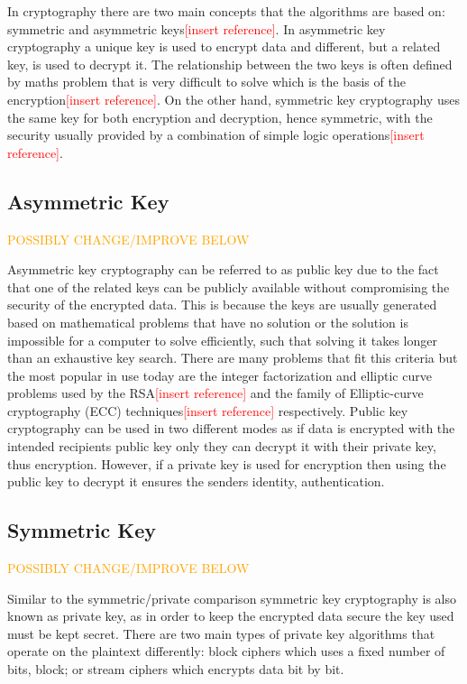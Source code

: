 \documentclass[12pt,twoside,a4paper]{report}
\begin{document}
	In cryptography there are two main concepts that the algorithms are based on: symmetric and asymmetric keys\textcolor{red}{[insert reference]}. In asymmetric key cryptography a unique key is used to encrypt data and different, but a related key, is used to decrypt it. The relationship between the two keys is often defined by maths problem that is very difficult to solve which is the basis of the encryption\textcolor{red}{[insert reference]}. On the other hand, symmetric key cryptography uses the same key for both encryption and decryption, hence symmetric, with the security usually provided by a combination of simple logic operations\textcolor{red}{[insert reference]}.
    
	\subsection{Asymmetric Key}
	\textcolor{orange}{POSSIBLY CHANGE/IMPROVE BELOW}
    
	Asymmetric key cryptography can be referred to as public key due to the fact that one of the related keys can be publicly available without compromising the security of the encrypted data. This is because the keys are usually generated based on mathematical problems that have no solution or the solution is impossible for a computer to solve efficiently, such that solving it takes longer than an exhaustive key search\cite{BruceSchneier2000}. There are many problems that fit this criteria but the most popular in use today are the integer factorization and elliptic curve problems used by the RSA\textcolor{red}{[insert reference]} and the family of Elliptic-curve cryptography (ECC) techniques\textcolor{red}{[insert reference]} respectively. Public key cryptography can be used in two different modes as if data is encrypted with the intended recipients public key only they can decrypt it with their private key, thus encryption. However, if a private key is used for encryption then using the public key to decrypt it ensures the senders identity, authentication\cite{AlfredJ.Menezes1996}.
    
	\subsection{Symmetric Key}
	\textcolor{orange}{POSSIBLY CHANGE/IMPROVE BELOW}
    
	Similar to the symmetric/private comparison symmetric key cryptography is also known as private key, as in order to keep the encrypted data secure the key used must be kept secret. There are two main types of private key algorithms that operate on the plaintext differently: block ciphers which uses a fixed number of bits, block; or stream ciphers which encrypts data bit by bit\cite{AlfredJ.Menezes1996}.
    
\end{document}
